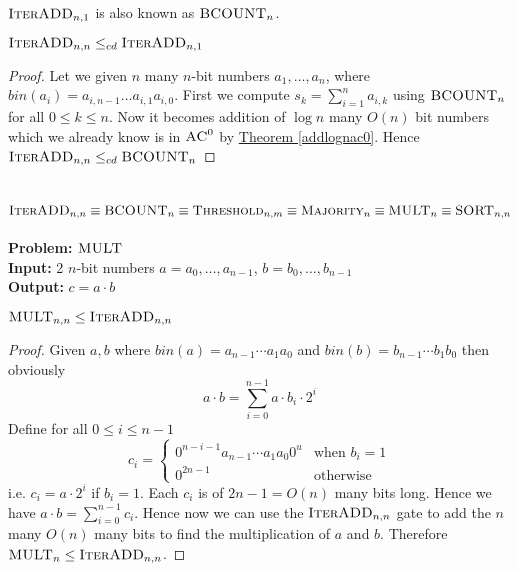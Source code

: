 \begin{remark}
	$\textsc{IterADD}_{n,1}$ is also known as $\textsc{BCOUNT}_n$.
\end{remark}
\begin{theorem}\label{addnnbcrel}
	$\textsc{IterADD}_{n,n}\leq_{cd} \textsc{IterADD}_{n,1}$
\end{theorem}

\begin{proof}
Let we given $n$ many $n$-bit numbers $a_1,\dots,a_n$, where $bin(a_i)=a_{i,n-1}\dots a_{i,1}a_{i,0}$. First we compute $s_{k}=\sum\limits_{i=1}^n a_{i,k}$ using $\textsc{BCOUNT}_n$ for all $0\leq k\leq n$. Now it becomes addition of $\log n$ many $O(n)$ bit numbers which we already know is in $\textsc{AC}^0$ by \hyperref[addlognac0]{Theorem \ref{addlognac0}}. Hence $\textsc{IterADD}_{n,n}\leq_{cd} \textsc{BCOUNT}_n$
\end{proof}


\section{$\textsc{IterADD}_{n,n}\equiv \textsc{BCOUNT}_n\equiv \textsc{Threshold}_{n,m} \equiv \textsc{Majority}_n\equiv \textsc{MULT}_{n}\equiv \textsc{SORT}_{n,n}$}
\textbf{Problem:} $\textsc{MULT}$\\
\textbf{Input:} 2 $n$-bit numbers $a=a_0,\dots,a_{n-1}$, $b=b_0,\dots,b_{n-1}$\\
\textbf{Output:} $c=a\cdot b$\\
\begin{theorem}\label{multaddrel}
	$\textsc{MULT}_{n,n}\leq \textsc{IterADD}_{n,n}$
\end{theorem}
\begin{proof}
	Given $a,b$ where $bin(a)=a_{n-1}\cdots a_1a_0$ and $bin(b)=b_{n-1}\cdots b_1b_0$ then obviously $$a\cdot b=\sum\limits_{i=0}^{n-1}a\cdot b_i\cdot 2^i$$Define for all $0\leq i\leq n-1$ $$c_i=\begin{cases}
		0^{n-i-1}a_{n-1}\cdots a_1a_0 0^u & \text{when $b_i=1$}\\
		0^{2n-1} & \text{otherwise}
	\end{cases}$$i.e. $c_i=a\cdot 2^i$ if $b_i=1$. Each $c_i$ is of $2n-1=O(n) $ many bits long. Hence we have $a\cdot b=\sum\limits_{i=0}^{n-1} c_i$. Hence now we can use the $\textsc{IterADD}_{n,n}$ gate to add the $n$ many $O(n)$ many bits to find the multiplication of $a$ and $b$. Therefore $\textsc{MULT}_n\leq \textsc{IterADD}_{n,n}$.
\end{proof}\parinf

